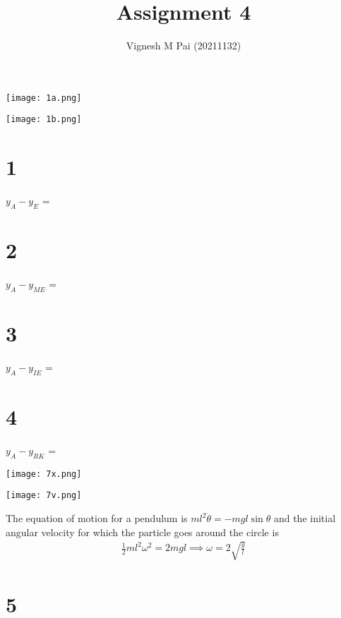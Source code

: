 \documentclass{article}
\title{Assignment 4}
\author{Vignesh M Pai (20211132)}
\date{}
\begin{document}
\maketitle

\begin{center}
    \texttt{[image: 1a.png]}
\end{center}

\begin{center}
    \texttt{[image: 1b.png]}
\end{center}

\section*{1}

$y_A - y_E$ = 

\section*{2}

$y_A - y_{ME}$ = 

\section*{3}

$y_A - y_{IE}$ = 

\section*{4}

$y_A - y_{RK}$ = 

\begin{center}
    \texttt{[image: 7x.png]}
\end{center}

\begin{center}
    \texttt{[image: 7v.png]}
\end{center}

The equation of motion for a pendulum is $ml^2 \ddot{\theta} = -mg l \sin \theta$ and the initial angular velocity for which the particle goes around the circle is
\begin{align*}
    \frac{1}{2}ml^2 \omega^2 = 2 m g l \implies \omega = 2 \sqrt{\frac{g}{l}}
\end{align*}

\section*{5}
\end{document}
